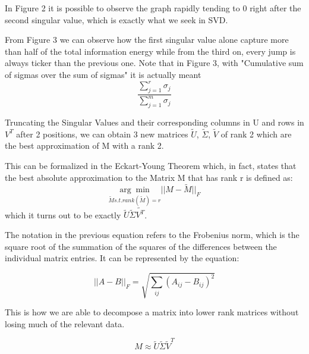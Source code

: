 \documentclass[10pt]{article}
\theoremstyle{plain}
\theoremstyle{definition}
\begin{document}
In Figure 2 it is possible to observe the graph rapidly tending to $0$ right after the second singular value, which is exactly what we seek in SVD.

From Figure 3 we can observe how the first singular value alone capture more than half of the total information energy while from the third on, every jump is always ticker than the previous one.
Note that in Figure $3$, with "Cumulative sum of sigmas over the sum of sigmas" it is actually meant \begin{equation}
\frac{\sum_{j=1}^r{\sigma_j}}{\sum_{j=1}^m{\sigma_j}}
\end{equation}


Truncating the Singular Values and their corresponding columns in U and rows in $V^T$  after 2 positions, we can obtain 3 new matrices $\tilde{U}$, $\tilde{\Sigma}$, $\tilde{V}$ of rank 2 which are the best approximation of M with a rank 2.

This can be formalized in the Eckart-Young Theorem which, in fact, states that the best absolute approximation to the Matrix M that has rank r is defined as:
\begin{equation}
    \underset{\tilde{M} s.t. rank(\tilde{M})=r}{\arg\min} ||M - \tilde{M}||_F   
\end{equation}
which it turns out to be exactly $\tilde{U}$$\tilde{\Sigma}$$\tilde{V^T}$.

The notation in the previous equation refers to the Frobenius norm, which is the square root of the summation of the squares of the differences between the individual matrix entries. It can be represented by the equation:

\begin{equation}
    ||A-B||_F = \sqrt{\sum_{ij}(A_{ij}-B_{ij})^2}
\end{equation}

This is how we are able to decompose a matrix into lower rank matrices without losing much of the relevant data.

\begin{equation}
M \approx \tilde{U} \tilde{\Sigma} \tilde{V}^T
\end{equation}
\end{document}
